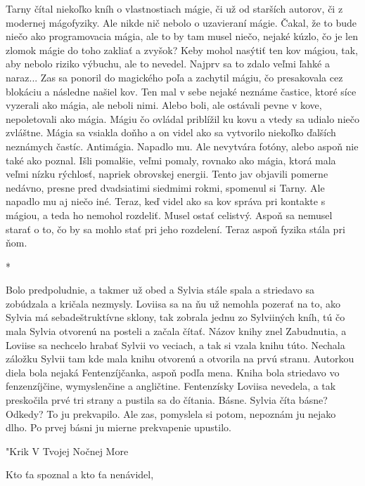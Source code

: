 \documentclass{book}
\begin{document}
Tarny čítal niekoľko kníh o vlastnostiach mágie, či už od starších autorov, či z modernej mágofyziky. Ale nikde nič nebolo o uzavieraní mágie. Čakal, že to bude niečo ako programovacia mágia, ale to by tam musel niečo, nejaké kúzlo, čo je len zlomok mágie do toho zakliať a zvyšok? Keby mohol nasýtiť ten kov mágiou, tak, aby nebolo riziko výbuchu, ale to nevedel. Najprv sa to zdalo veľmi ľahké a naraz... Zas sa ponoril do magického poľa a zachytil mágiu, čo presakovala cez blokáciu a následne našiel kov. Ten mal v sebe nejaké neznáme častice, ktoré síce vyzerali ako mágia, ale neboli nimi. Alebo boli, ale ostávali pevne v kove, nepoletovali ako mágia. Mágiu čo ovládal priblížil ku kovu a vtedy sa udialo niečo zvláštne. Mágia sa vsiakla doňho a on videl ako sa vytvorilo niekoľko ďalších neznámych častíc. Antimágia. Napadlo mu. Ale nevytvára fotóny, alebo aspoň nie také ako poznal. Išli pomalšie, veľmi pomaly, rovnako ako mágia, ktorá mala veľmi nízku rýchlosť, napriek obrovskej energii. Tento jav objavili pomerne nedávno, presne pred dvadsiatimi siedmimi rokmi, spomenul si Tarny. Ale napadlo mu aj niečo iné. Teraz, keď videl ako sa kov správa pri kontakte s mágiou, a teda ho nemohol rozdeliť. Musel ostať celistvý. Aspoň sa nemusel starať o to, čo by sa mohlo stať pri jeho rozdelení. Teraz aspoň fyzika stála pri ňom.

\begin{center}

*

\end{center}

Bolo predpoludnie, a takmer už obed a Sylvia stále spala a striedavo sa zobúdzala a kričala nezmysly. Loviisa sa na ňu už nemohla pozerať na to, ako Sylvia má sebadeštruktívne sklony, tak zobrala jednu zo Sylviiných kníh, tú čo mala Sylvia otvorenú na posteli a začala čítať. Názov knihy znel Zabudnutia, a Loviise sa nechcelo hrabať Sylvii vo veciach, a tak si vzala knihu túto. Nechala záložku Sylvii tam kde mala knihu otvorenú a otvorila na prvú stranu. Autorkou diela bola nejaká Fentenzíjčanka, aspoň podľa mena. Kniha bola striedavo vo fenzenzíjčine, wymyslenčine a angličtine. Fentenzísky Loviisa nevedela, a tak preskočila prvé tri strany a pustila sa do čítania. Básne. Sylvia číta básne? Odkedy? To ju prekvapilo. Ale zas, pomyslela si potom, nepoznám ju nejako dlho. Po prvej básni ju mierne prekvapenie upustilo.

"$ $Krik V Tvojej Nočnej More

Kto ťa spoznal a kto ťa nenávidel,
\end{document}
